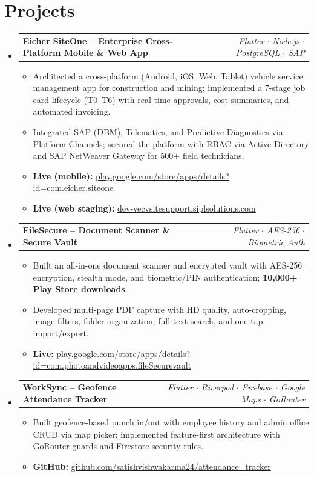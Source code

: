\documentclass[a4paper,10pt]{article}
\makeatletter
\newcommand{\resumeProjectHeading}[2]{
  \vspace{2pt}\item
  \begin{tabular*}{\textwidth}{l@{\extracolsep{\fill}}r}
    \textbf{#1} & \textit{\small #2} \\
  \end{tabular*}\vspace{-4pt}
}
\newcommand{\resumeItem}[1]{\item\small{#1\vspace{-1pt}}}
\makeatother
\begin{document}
\section{Projects}

\begin{itemize}[leftmargin=0.15in, label={}]

\resumeProjectHeading
  {Eicher SiteOne \textnormal{-- Enterprise Cross-Platform Mobile \& Web App}}
  {Flutter $\cdot$ Node.js $\cdot$ PostgreSQL $\cdot$ SAP}
\begin{itemize}[leftmargin=*]
  \resumeItem{Architected a cross-platform (Android, iOS, Web, Tablet) vehicle service management app for construction and mining; implemented a 7-stage job card lifecycle (T0--T6) with real-time approvals, cost summaries, and automated invoicing.}
  \resumeItem{Integrated SAP (DBM), Telematics, and Predictive Diagnostics via Platform Channels; secured the platform with RBAC via Active Directory and SAP NetWeaver Gateway for 500+ field technicians.}
  \resumeItem{\textbf{Live (mobile):} \href{https://play.google.com/store/apps/details?id=com.eicher.siteone}{play.google.com/store/apps/details?id=com.eicher.siteone}}
  \resumeItem{\textbf{Live (web staging):} \href{https://dev-vecvsitesupport.siplsolutions.com}{dev-vecvsitesupport.siplsolutions.com}}
\end{itemize}

\vspace{4pt}

\resumeProjectHeading
  {FileSecure \textnormal{-- Document Scanner \& Secure Vault}}
  {Flutter $\cdot$ AES-256 $\cdot$ Biometric Auth}
\begin{itemize}[leftmargin=*]
  \resumeItem{Built an all-in-one document scanner and encrypted vault with AES-256 encryption, stealth mode, and biometric/PIN authentication; \textbf{10,000+ Play Store downloads}.}
  \resumeItem{Developed multi-page PDF capture with HD quality, auto-cropping, image filters, folder organization, full-text search, and one-tap import/export.}
  \resumeItem{\textbf{Live:} \href{https://play.google.com/store/apps/details?id=com.photoandvideoapps.fileSecurevault}{play.google.com/store/apps/details?id=com.photoandvideoapps.fileSecurevault}}
\end{itemize}

\vspace{4pt}

\resumeProjectHeading
  {WorkSync \textnormal{-- Geofence Attendance Tracker}}
  {Flutter $\cdot$ Riverpod $\cdot$ Firebase $\cdot$ Google Maps $\cdot$ GoRouter}
\begin{itemize}[leftmargin=*]
  \resumeItem{Built geofence-based punch in/out with employee history and admin office CRUD via map picker; implemented feature-first architecture with GoRouter guards and Firestore security rules.}
  \resumeItem{\textbf{GitHub:} \href{https://github.com/satishvishwakarma24/attendance_tracker}{github.com/satishvishwakarma24/attendance\_tracker}}
\end{itemize}


\end{itemize}
\end{document}
